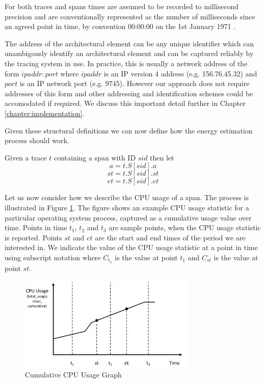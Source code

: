 For both traces and spans times are assumed to be recorded to millisecond precision and are conventionally represented as the number of milliseconds since an agreed point in time, by convention 00:00:00 on the 1st January 1971 \cite{josey2004-ieee1003}.

The address of the architectural element can be any unique identifier which can unambigously identify an architectural element and can be captured reliably by the tracing system in use.  In practice, this is usually a network address of the form $ipaddr:port$ where $ipaddr$ is an IP version 4 address (e.g. 156.76.45.32) and $port$ is an IP network port (e.g. 9745).  However our approach does not require addresses of this form and other addressing and identification schemes could be accomodated if required.  We discuss this important detail further in Chapter \ref{chapter:implementation}.

Given these structural definitions we can now define how the energy estimation process should work.

Given a trace $t$ containing a span with ID $sid$ then let
\begin{equation}
a = t.S[sid].a
\end{equation}
\begin{equation}
st = t.S[sid].st
\end{equation}
\begin{equation}
et = t.S[sid].et
\end{equation}

Let us now consider how we describe the CPU usage of a span.  The process is illustrated in Figure \ref{figure:graph}.  The figure shows an example CPU usage statistic for a particular operating system process, captured as a cumulative usage value over time.  Points in time $t_{1}$, $t_{2}$ and $t_{3}$ are sample points, when the CPU usage statistic is reported.  Points $st$ and $et$ are the start and end times of the period we are interested in.  We indicate the value of the CPU usage statistic at a point in time using subscript notation where $C_{t_{1}}$ is the value at point $t_{1}$ and $C_{st}$ is the value at point $st$.

\begin{figure}
\centering
\includegraphics[width=0.75\textwidth]{Figures/estimating-energy-graph}
\caption{Cumulative CPU Usage Graph}
\label{figure:graph}
\end{figure}


